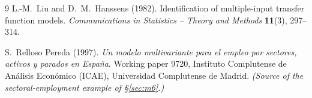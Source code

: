 \documentclass[11pt,a4paper]{article}
\theoremstyle{plain}
\theoremstyle{remark}
\begin{document}
\begin{thebibliography}{9}
L.-M.~Liu and D.~M.~Hanssens (1982).
Identification of multiple-input transfer function models.
\emph{Communications in Statistics -- Theory and Methods} \textbf{11}(3), 297--314.

S.~Relloso Pereda (1997).
\emph{Un modelo multivariante para el empleo por sectores, activos y parados en
Espa\~na}. Working paper 9720, Instituto Complutense de An\'alisis Econ\'omico
(ICAE), Universidad Complutense de Madrid.
\emph{(Source of the sectoral-employment example of \S\ref{sec:m6}.)}

\end{thebibliography}
\end{document}
